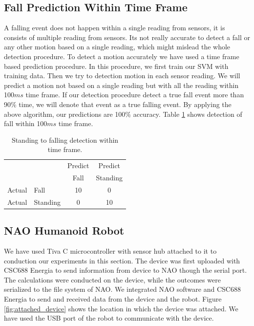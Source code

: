 \documentclass{llncs}
\begin{document}
\begin{sloppy}
\subsection{Fall Prediction Within Time Frame}

A falling event does not happen within a single reading from sensors, it is consists of multiple
reading from sensors.  Its not really accurate to detect a fall or any other motion based on a
single reading, which might mislead the whole detection procedure. To detect a motion accurately we
have used a time frame based prediction procedure. In this procedure, we first train our SVM with
training data. Then we try to detection motion in each sensor reading. We will predict a motion not
based on a single reading but with all the reading within 100$ms$ time frame. If our detection
procedure detect a true fall event more than 90\% time, we will denote that event as a true
falling event. By applying the above algorithm, our predictions are 100\% accuracy.
Table \ref{tab:StandingToFallingDetectionsvmframe} shows detection of fall within 100$ms$ time
frame.

\begin{table}[!h]
\caption{Standing to falling detection within time frame.}
	\label{tab:StandingToFallingDetectionsvmframe}
	\centering
		\begin{tabular} {l l |c |c}
			& & Predict& Predict \\ 
			& & Fall & Standing \\ \hline
			Actual& Fall & 10 & 0\\ \hline
			Actual& Standing & 0& 10\\ \hline
		\end{tabular}
\end{table}

\subsection{NAO Humanoid Robot}

We have used Tiva C microcontroller with sensor hub attached to it to conduction our experiments in
this section. The device was first uploaded with CSC688 Energia to send information from device to
NAO though the serial port. The calculations were conducted on the device, while the outcomes were
serialized to the file system of NAO. We integrated NAO software and CSC688 Energia to send and
received data from the device and the robot. Figure \ref{fig:attached_device} shows the location in
which the device was attached. We have used the USB port of the robot to communicate with the
device.  



\end{sloppy}
\end{document}
